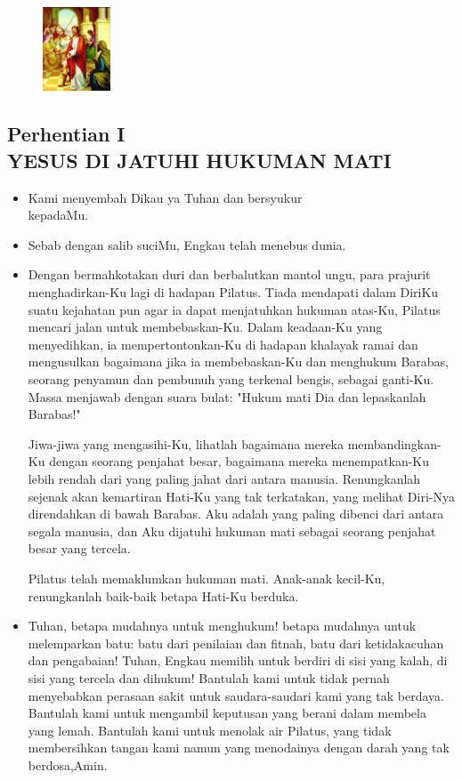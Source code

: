 \documentclass[a5paper,headsepline,titlepage,10pt,nnormalheadings,DIVcalc]{scrbook}
\newcommand{\BU}[1]{\begin{itemize} \item[U:] #1 \end{itemize}}
\newcommand{\BP}[1]{\begin{itemize} \item[P:] #1 \end{itemize}}
\newcommand{\kamiMenyembah}{\BP{ Kami menyembah Dikau ya Tuhan dan bersyukur\\kepadaMu.}
\BU{ Sebab dengan salib suciMu, Engkau telah menebus dunia.}
}
\begin{document}
\begin{figure}
\includegraphics[width=2cm]{jalansalib_files/01_small.jpg}
\end{figure}
\subsection*{Perhentian I \\
YESUS DI JATUHI HUKUMAN MATI}

\kamiMenyembah
\BP{Dengan bermahkotakan duri dan berbalutkan mantol ungu, para prajurit menghadirkan-Ku lagi di hadapan Pilatus. Tiada mendapati dalam DiriKu suatu kejahatan pun agar ia dapat menjatuhkan hukuman atas-Ku, Pilatus mencari jalan untuk membebaskan-Ku. Dalam keadaan-Ku yang menyedihkan, ia mempertontonkan-Ku di hadapan khalayak ramai dan mengusulkan bagaimana jika ia membebaskan-Ku dan menghukum Barabas, seorang penyamun dan pembunuh yang terkenal bengis, sebagai ganti-Ku. Massa menjawab dengan suara bulat: "Hukum mati Dia dan lepaskanlah Barabas!"

Jiwa-jiwa yang mengasihi-Ku, lihatlah bagaimana mereka membandingkan-Ku dengan seorang penjahat besar, bagaimana mereka menempatkan-Ku lebih rendah dari yang paling jahat dari antara manusia. Renungkanlah sejenak akan kemartiran Hati-Ku yang tak terkatakan, yang melihat Diri-Nya direndahkan di bawah Barabas. Aku adalah yang paling dibenci dari antara segala manusia, dan Aku dijatuhi hukuman mati sebagai seorang penjahat besar yang tercela.

Pilatus telah memaklumkan hukuman mati. Anak-anak kecil-Ku, renungkanlah baik-baik betapa Hati-Ku berduka.}

\BU{Tuhan, betapa mudahnya untuk menghukum! betapa mudahnya untuk melemparkan batu: batu dari penilaian dan fitnah, batu dari ketidakacuhan dan pengabaian! Tuhan, Engkau memilih untuk berdiri di sisi yang kalah, di sisi yang tercela dan dihukum!
Bantulah kami untuk tidak pernah menyebabkan perasaan sakit untuk saudara-saudari kami yang tak berdaya. Bantulah kami untuk mengambil keputusan yang berani dalam membela yang lemah. Bantulah kami untuk menolak air Pilatus, yang tidak membersihkan tangan kami namun yang menodainya dengan darah yang tak berdosa,Amin.}
 
\end{document}
